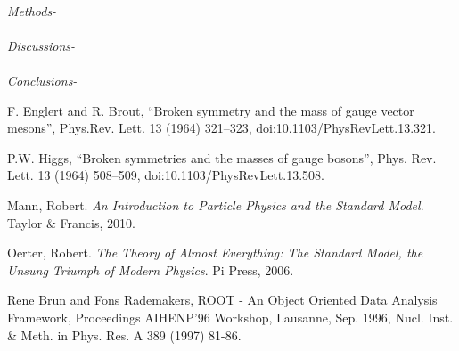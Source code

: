 \documentclass[aps,prl,twocolumn,superscriptaddress,groupedaddress,nofootinbib]{revtex4-2}  %
\begin{document}
\paragraph{}\emph{Methods-} 

\hspace{1cm}
\paragraph{}\emph{Discussions-} 


\hspace{1cm}
\paragraph*{}\emph{Conclusions-}




\vspace{4cm}



\begin{thebibliography}{9}

F. Englert and R. Brout, “Broken symmetry and the mass of gauge vector mesons”, Phys.Rev. Lett. 13 (1964) 321–323, doi:10.1103/PhysRevLett.13.321.

P.W. Higgs, “Broken symmetries and the masses of gauge bosons”, Phys. Rev. Lett. 13 (1964) 508–509, doi:10.1103/PhysRevLett.13.508.

Mann, Robert. \textit{An Introduction to Particle Physics and the Standard Model}. Taylor \& Francis, 2010. 

Oerter, Robert. \textit{The Theory of Almost Everything: The Standard Model, the Unsung Triumph of Modern Physics}. Pi Press, 2006. 

Rene Brun and Fons Rademakers, ROOT - An Object Oriented Data Analysis Framework, Proceedings AIHENP'96 Workshop, Lausanne, Sep. 1996, Nucl. Inst. & Meth. in Phys. Res. A 389 (1997) 81-86.


\end{thebibliography}



\end{document}
